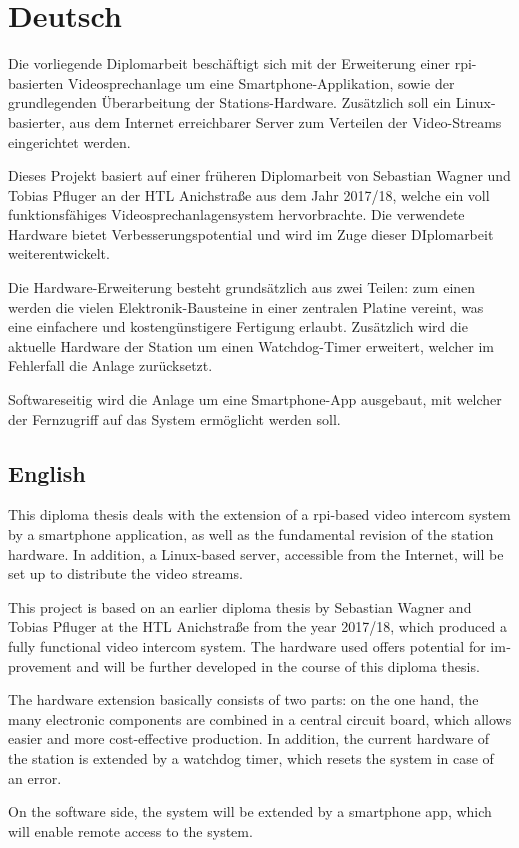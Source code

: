\section{Deutsch}
Die vorliegende Diplomarbeit beschäftigt sich mit der Erweiterung einer \ac{rpi}-basierten Videosprechanlage um eine Smartphone-Applikation, sowie der grundlegenden Überarbeitung der Stations-Hardware.
Zusätzlich soll ein Linux-basierter, aus dem Internet erreichbarer Server zum Verteilen der Video-Streams eingerichtet werden.
\par
Dieses Projekt basiert auf einer früheren Diplomarbeit von Sebastian Wagner und Tobias Pfluger an der HTL Anichstraße aus dem Jahr 2017/18, welche ein voll funktionsfähiges Videosprechanlagensystem hervorbrachte.
Die verwendete Hardware bietet Verbesserungspotential und wird im Zuge dieser DIplomarbeit weiterentwickelt.
\par
Die Hardware-Erweiterung besteht grundsätzlich aus zwei Teilen: zum einen werden die vielen Elektronik-Bausteine in einer zentralen Platine vereint, was eine einfachere und kostengünstigere Fertigung erlaubt.
Zusätzlich wird die aktuelle Hardware der Station um einen Watchdog-Timer erweitert, welcher im Fehlerfall die Anlage zurücksetzt.
\par
Softwareseitig wird die Anlage um eine Smartphone-App ausgebaut, mit welcher der Fernzugriff auf das System ermöglicht werden soll.
\par
\newpage

\begin{otherlanguage}{british}
	\section{English}
	This diploma thesis deals with the extension of a \ac{rpi}-based video intercom system by a smartphone application, as well as the fundamental revision of the station hardware.
	In addition, a Linux-based server, accessible from the Internet, will be set up to distribute the video streams.
	\par
	This project is based on an earlier diploma thesis by Sebastian Wagner and Tobias Pfluger at the HTL Anichstraße from the year 2017/18, which produced a fully functional video intercom system.
	The hardware used offers potential for improvement and will be further developed in the course of this diploma thesis.
	\par
	The hardware extension basically consists of two parts: on the one hand, the many electronic components are combined in a central circuit board, which allows easier and more cost-effective production.
	In addition, the current hardware of the station is extended by a watchdog timer, which resets the system in case of an error.
	\par
	On the software side, the system will be extended by a smartphone app, which will enable remote access to the system.
	\par
\end{otherlanguage}